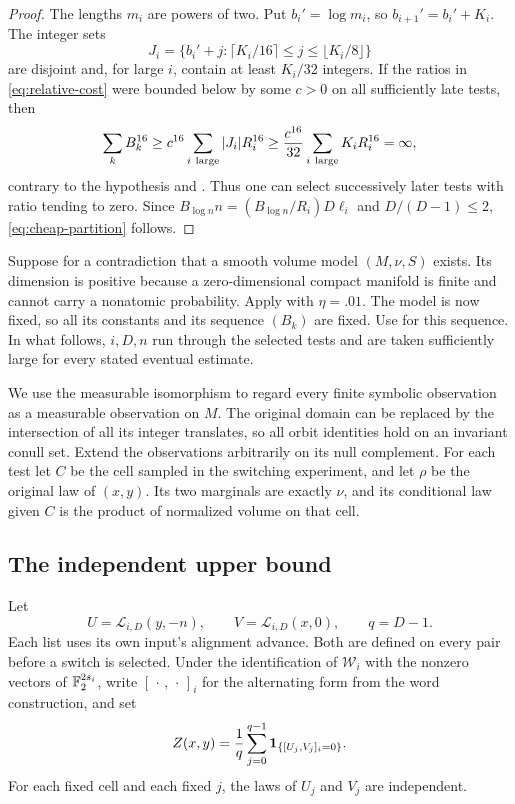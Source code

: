 \begin{proof}
The lengths $m_i$ are powers of two. Put $b_i'=\log m_i$,
so $b_{i+1}'=b_i'+K_i$. The integer sets
\[
 J_i=\{b_i'+j:\lceil K_i/16\rceil\le j\le
                         \lfloor K_i/8\rfloor\}
\]
are disjoint and, for large $i$, contain at least $K_i/32$
integers. If the ratios in \eqref{eq:relative-cost} were bounded
below by some $c>0$ on all sufficiently late tests, then
\[
 \sum_kB_k^{16}
 \ge c^{16}\sum_{i\ {\rm large}}|J_i|R_i^{16}
 \ge \frac{c^{16}}{32}
        \sum_{i\ {\rm large}}K_iR_i^{16}=\infty,
\]
contrary to the hypothesis and .
Thus one can select successively later tests with ratio tending
to zero. Since
$B_{\log n}n=(B_{\log n}/R_i)D\ell_i$
and $D/(D-1)\le2$, \eqref{eq:cheap-partition} follows.
\end{proof}

Suppose for a contradiction that a smooth volume model
$(M,\nu,S)$ exists. Its dimension is positive because a
zero-dimensional compact manifold is finite and cannot carry a
nonatomic probability. Apply  with
$\eta=.01$. The model is now fixed, so all its constants and
its sequence $(B_k)$ are fixed.
Use  for this sequence. In what follows,
$i,D,n$ run through the selected tests and are taken sufficiently
large for every stated eventual estimate.

We use the measurable isomorphism to regard every finite symbolic
observation as a measurable observation on $M$. The original domain
can be replaced by the intersection of all its integer translates,
so all orbit identities hold on an invariant conull set.
Extend the observations arbitrarily on its null complement.
For each test let $C$ be the cell sampled in the switching
experiment, and let $\rho$ be the original law of $(x,y)$.
Its two marginals are exactly $\nu$, and its conditional law
given $C$ is the product of normalized volume on that cell.

\subsection{The independent upper bound}

Let
\[
 U=\mathcal L_{i,D}(y,-n),\qquad
 V=\mathcal L_{i,D}(x,0),\qquad q=D-1.
\]
Each list uses its own input's alignment advance. Both are defined
on every pair before a switch is selected.
Under the identification of $\mathcal W_i$ with the nonzero
vectors of $\mathbb F_2^{2s_i}$, write $[\,\cdot\,,\,\cdot\,]_i$ for
the alternating form from the word construction, and set
\begin{equation}\label{eq:passing-statistic}
 Z(x,y)=\frac1q\sum_{j=0}^{q-1}
          \mathbf 1_{\{[U_j,V_j]_i=0\}}.
\end{equation}
For each fixed cell and each fixed $j$, the laws of $U_j$ and
$V_j$ are independent.

